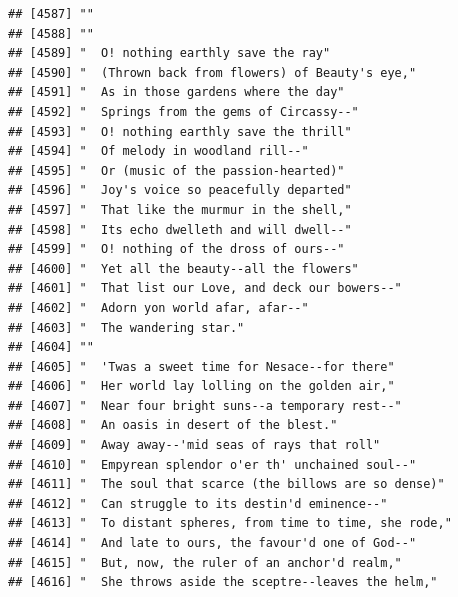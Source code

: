 \documentclass{article}\usepackage[]{graphicx}\usepackage[]{color}
\makeatletter
\newenvironment{kframe}{%
 \def\at@end@of@kframe{}%
 \ifinner\ifhmode%
  \def\at@end@of@kframe{\end{minipage}}%
  \begin{minipage}{\columnwidth}%
 \fi\fi%
 \def\FrameCommand##1{\hskip\@totalleftmargin \hskip-\fboxsep
 \colorbox{shadecolor}{##1}\hskip-\fboxsep
     \hskip-\linewidth \hskip-\@totalleftmargin \hskip\columnwidth}%
 \MakeFramed {\advance\hsize-\width
   \@totalleftmargin\z@ \linewidth\hsize
   \@setminipage}}%
 {\par\unskip\endMakeFramed%
 \at@end@of@kframe}
\newenvironment{knitrout}{}{} %
\makeatother
\begin{document}
\begin{knitrout}
\begin{kframe}
\begin{verbatim}
## [4587] ""                                                                            
## [4588] ""                                                                            
## [4589] "  O! nothing earthly save the ray"                                           
## [4590] "  (Thrown back from flowers) of Beauty's eye,"                               
## [4591] "  As in those gardens where the day"                                         
## [4592] "  Springs from the gems of Circassy--"                                       
## [4593] "  O! nothing earthly save the thrill"                                        
## [4594] "  Of melody in woodland rill--"                                              
## [4595] "  Or (music of the passion-hearted)"                                         
## [4596] "  Joy's voice so peacefully departed"                                        
## [4597] "  That like the murmur in the shell,"                                        
## [4598] "  Its echo dwelleth and will dwell--"                                        
## [4599] "  O! nothing of the dross of ours--"                                         
## [4600] "  Yet all the beauty--all the flowers"                                       
## [4601] "  That list our Love, and deck our bowers--"                                 
## [4602] "  Adorn yon world afar, afar--"                                              
## [4603] "  The wandering star."                                                       
## [4604] ""                                                                            
## [4605] "  'Twas a sweet time for Nesace--for there"                                  
## [4606] "  Her world lay lolling on the golden air,"                                  
## [4607] "  Near four bright suns--a temporary rest--"                                 
## [4608] "  An oasis in desert of the blest."                                          
## [4609] "  Away away--'mid seas of rays that roll"                                    
## [4610] "  Empyrean splendor o'er th' unchained soul--"                               
## [4611] "  The soul that scarce (the billows are so dense)"                           
## [4612] "  Can struggle to its destin'd eminence--"                                   
## [4613] "  To distant spheres, from time to time, she rode,"                          
## [4614] "  And late to ours, the favour'd one of God--"                               
## [4615] "  But, now, the ruler of an anchor'd realm,"                                 
## [4616] "  She throws aside the sceptre--leaves the helm,"                            

\end{verbatim}
\end{kframe}
\end{knitrout}
\end{document}
